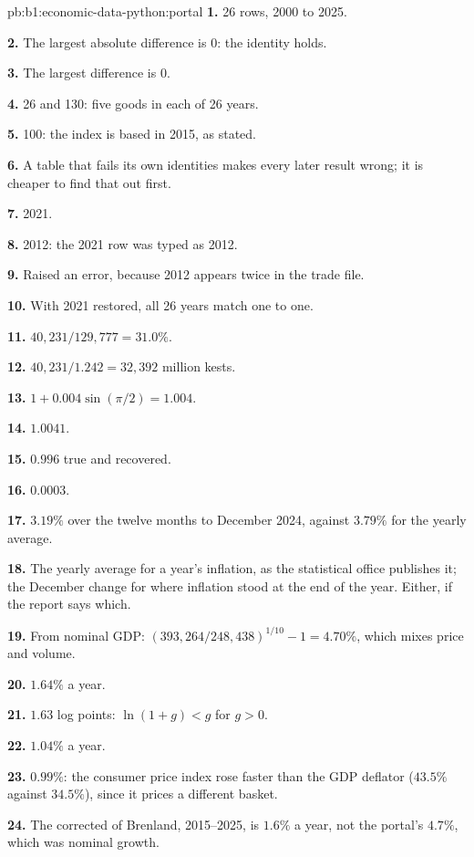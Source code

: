 \begin{solution}{pb:b1:economic-data-python:portal}
\textbf{1.} 26 rows, 2000 to 2025.

\textbf{2.} The largest absolute difference is 0: the identity holds.

\textbf{3.} The largest difference is 0.

\textbf{4.} 26 and 130: five goods in each of 26 years.

\textbf{5.} 100: the index is based in 2015, as stated.

\textbf{6.} A table that fails its own identities makes every later result
wrong; it is cheaper to find that out first.

\textbf{7.} 2021.

\textbf{8.} 2012: the 2021 row was typed as 2012.

\textbf{9.} Raised an error, because 2012 appears twice in the trade file.

\textbf{10.} With 2021 restored, all 26 years match one to one.

\textbf{11.} $40{,}231/129{,}777 = 31.0\%$.

\textbf{12.} $40{,}231/1.242 = 32{,}392$ million kests.

\textbf{13.} $1 + 0.004\sin(\pi/2) = 1.004$.

\textbf{14.} $1.0041$.

\textbf{15.} $0.996$ true and recovered.

\textbf{16.} $0.0003$.

\textbf{17.} $3.19\%$ over the twelve months to December 2024, against $3.79\%$ for the
yearly average.

\textbf{18.} The yearly average for a year's inflation, as the statistical
office publishes it; the December change for where inflation stood at the
end of the year. Either, if the report says which.

\textbf{19.} From nominal GDP: $(393{,}264/248{,}438)^{1/10} - 1 = 4.70\%$, which mixes price and
volume.

\textbf{20.} $1.64\%$ a year.

\textbf{21.} $1.63$ log points: $\ln(1 + g) < g$ for $g > 0$.

\textbf{22.} $1.04\%$ a year.

\textbf{23.} $0.99\%$: the consumer price index rose faster than the GDP
deflator ($43.5\%$ against $34.5\%$), since it prices a different basket.

\textbf{24.} The corrected  of Brenland, 2015--2025, is $1.6\%$ a year, not
the portal's $4.7\%$, which was nominal growth.
\end{solution}
